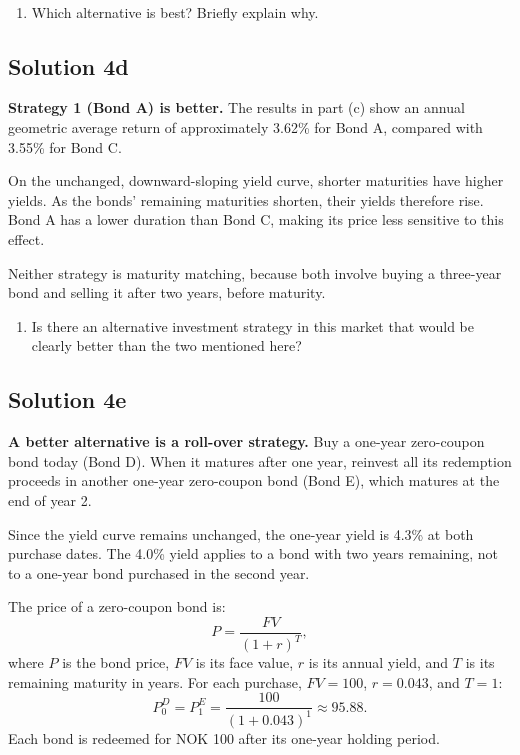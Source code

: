 \documentclass[12]{article}
\begin{document}
\noindent
\\
\color{black}
\begin{enumerate}
    \item [d)] Which alternative is best? Briefly explain why.
\end{enumerate}

\color{blue}
\subsection*{Solution 4d}
\noindent\textbf{Strategy 1 (Bond A) is better.}
The results in part (c) show an annual geometric average return of approximately 3.62\% for Bond A, compared with 3.55\% for Bond C.

\par\noindent On the unchanged, downward-sloping yield curve, shorter maturities have higher yields. As the bonds' remaining maturities shorten, their yields therefore rise. Bond A has a lower duration than Bond C, making its price less sensitive to this effect.

\par\noindent Neither strategy is maturity matching, because both involve buying a three-year bond and selling it after two years, before maturity.


\noindent

\color{black}
\begin{enumerate}
    \item [e)] Is there an alternative investment strategy in this market that would be clearly better than the two mentioned here?
\end{enumerate}

\color{blue}
\subsection*{Solution 4e}
\noindent\textbf{A better alternative is a roll-over strategy.}
Buy a one-year zero-coupon bond today (Bond D). When it matures after one year, reinvest all its redemption proceeds in another one-year zero-coupon bond (Bond E), which matures at the end of year 2.

\par\noindent Since the yield curve remains unchanged, the one-year yield is 4.3\% at both purchase dates. The 4.0\% yield applies to a bond with two years remaining, not to a one-year bond purchased in the second year.

\par\noindent The price of a zero-coupon bond is:
\[
P=\frac{FV}{(1+r)^T},
\]
where $P$ is the bond price, $FV$ is its face value, $r$ is its annual yield, and $T$ is its remaining maturity in years.
For each purchase, $FV=100$, $r=0.043$, and $T=1$:
\[
P_0^D=P_1^E=\frac{100}{(1+0.043)^1}\approx95.88.
\]
Each bond is redeemed for NOK 100 after its one-year holding period.
\end{document}

